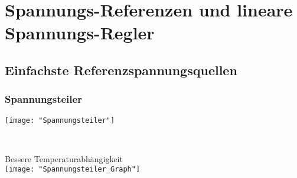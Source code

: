 \section{Spannungs-Referenzen und lineare Spannungs-Regler}
\subsection{Einfachste Referenzspannungsquellen}
\subsubsection{Spannungsteiler}
\begin{minipage}[t]{0.3\textwidth}
	\vspace{0pt}								%
	\texttt{[image: "Spannungsteiler"]}
\end{minipage}\hspace{0.05\textwidth}
\begin{minipage}[t]{0.3\textwidth}
	\vspace{0pt}
	\\
\end{minipage}
\begin{minipage}[t]{0.3\textwidth}
	\vspace{0pt}
	Bessere Temperaturabhängigkeit\\
	\texttt{[image: "Spannungsteiler\_Graph"]}
\end{minipage}
\vspace{2mm}

